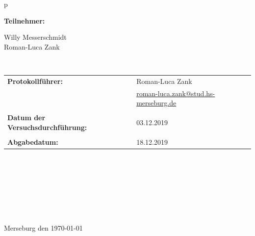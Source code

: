 \begin{center}
\begin{tabular}{p{\textwidth}}
\begin{center}
\Large{\textbf{Teilnehmer:}} \\ 
\end{center}
\begin{center}
\large{Willy Messerschmidt \\
		Roman-Luca Zank} \\
\end{center}


\\

\begin{center}
\begin{tabular}{lll}
\large{\textbf{Protokollführer:}} & & \large{Roman-Luca Zank} \\
& & \href{mailto:roman-luca.zank@stud.hs-merseburg.de}{{\footnotesize roman-luca.zank@stud.hs-merseburg.de}}\\
&&\\
\large{\textbf{Datum der Versuchsdurchführung:}}&& \large{03.12.2019}\\
&&\\
\large{\textbf{Abgabedatum:}}&& \large{18.12.2019}
\end{tabular}
\end{center}

\\ \\ \\ \\ \\ \\ \\ 
\large{Merseburg den \today}

\end{tabular}
\end{center}
